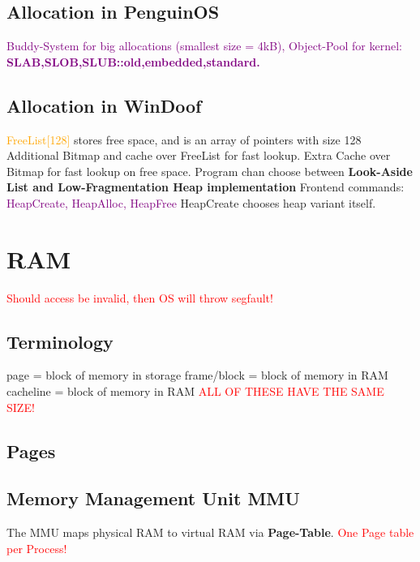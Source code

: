 \documentclass[main.tex,fontsize=8pt,paper=a4,paper=landscape,DIV=calc,]{scrartcl}
\begin{document}
\begin{multicols*}{4}
\subsection{Allocation in PenguinOS}
\textcolor{purple}{Buddy-System for big allocations (smallest size = 4kB), Object-Pool for kernel: \newline 
\textbf{SLAB,SLOB,SLUB::old,embedded,standard.}}

\subsection{Allocation in WinDoof}
\textcolor{orange}{FreeList[128]} stores free space, and is an array of pointers with size 128\newline
Additional Bitmap and cache over FreeList for fast lookup.\newline
Extra Cache over Bitmap for fast lookup on free space.\newline
Program chan choose between \textbf{Look-Aside List and Low-Fragmentation Heap implementation}\newline
Frontend commands: \textcolor{purple}{HeapCreate, HeapAlloc, HeapFree}\newline
HeapCreate chooses heap variant itself.

\section{RAM}
\textcolor{red}{Should access be invalid, then OS will throw segfault!}

\subsection{Terminology}
page = block of memory in storage
frame/block = block of memory in RAM
cacheline = block of memory in RAM
\textcolor{red}{ALL OF THESE HAVE THE SAME SIZE!}

\subsection{Pages}

\subsection{Memory Management Unit MMU}
The MMU maps physical RAM to virtual RAM via \textbf{Page-Table}.\newline
\textcolor{red}{One Page table per Process!}


\end{multicols*}
\end{document}
